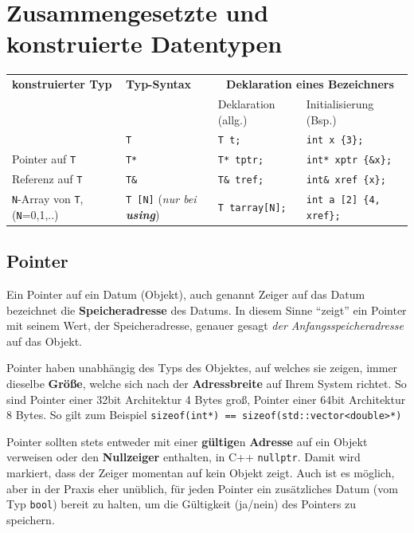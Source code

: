 \documentclass[a4paper]{report}
\begin{document}
\section{Zusammengesetzte und konstruierte Datentypen}

\begin{center}
	\begin{tabular}{|l|l|l|l|} \hline
		\textbf{konstruierter Typ} & \textbf{Typ-Syntax} & \multicolumn{2}{c|}{\textbf{Deklaration eines Bezeichners}}\\ 
		&& Deklaration (allg.) & Initialisierung (Bsp.) \\ \hline
		[identischer Typ] & \texttt{T} & \texttt{T t;} & \texttt{int x \{3\};} \\ \hline
		Pointer auf \texttt{T} & \texttt{T*} & \texttt{T* tptr;} & \texttt{int* xptr \{\&x\};} \\ \hline
		Referenz auf \texttt{T} & \texttt{T\&} & \texttt{T\& tref;} & \texttt{int\& xref \{x\};} \\ \hline
		\texttt{N}-Array von \texttt{T}, (\texttt{N}=0,1,..)& \texttt{T [N]} (\textit{nur bei \textbf{using}}) & \texttt{T tarray[N];} & \texttt{int a [2] \{4, xref\};} \\ \hline
	\end{tabular}
\end{center}

\subsection{Pointer}
Ein Pointer auf ein Datum (Objekt), auch genannt Zeiger auf das Datum bezeichnet die \textbf{Speicheradresse} des Datums. In diesem Sinne "`zeigt"' ein Pointer mit seinem Wert, der Speicheradresse, genauer gesagt \textit{der Anfangsspeicheradresse} auf das Objekt.
\medskip

Pointer haben unabhängig des Typs des Objektes, auf welches sie zeigen, immer dieselbe \textbf{Größe}, welche sich nach der \textbf{Adressbreite} auf Ihrem System richtet. So sind Pointer einer 32bit Architektur 4 Bytes groß, Pointer einer 64bit Architektur 8 Bytes. So gilt zum Beispiel \texttt{sizeof(int*) == sizeof(std::vector<double>*)}
\medskip

Pointer sollten stets entweder mit einer \textbf{gültige}n \textbf{Adresse} auf ein Objekt verweisen oder den \textbf{Nullzeiger} enthalten, in C++ \texttt{nullptr}. Damit wird markiert, dass der Zeiger momentan auf kein Objekt zeigt. Auch ist es möglich, aber in der Praxis eher unüblich, für jeden Pointer ein zusätzliches Datum (vom Typ \texttt{bool}) bereit zu halten, um die Gültigkeit (ja/nein) des Pointers zu speichern.
\end{document}
